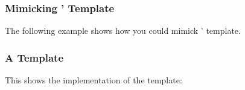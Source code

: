 \documentclass{xsim-manual}
\begin{document}
\subsubsection{Mimicking '  Template}
\label{sec:margin-template}

The following example shows how you could mimick '
 template.

\begin{sourcecode}
    {%
      \trivlist
      \item[\llap{%
        \smash{%
          \tabular[t]{@{}r@{}}
            \textbf{\XSIMmixedcase{\GetExerciseName}~\GetExerciseProperty{counter}}
            \IfExercisePropertySetT{points}{%
              \tabularnewline
              (%
                \printgoal{\GetExerciseProperty{points}}%
                \GetExercisePropertyT{bonus-points}{+\printgoal{#1}}%
                \,\XSIMtranslate{point-abbr}%
              )%
            }%
          \endtabular
        }%
      }]\relax
    }
    {\endtrivlist}
\end{sourcecode}

\subsubsection{A  Template}
\label{sec:minimal-template}

This shows the implementation of the  template:
\begin{sourcecode}
    {%
      \textbf{}%
    }
    {}
\end{sourcecode}
\end{document}
